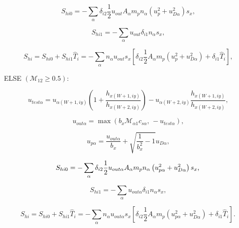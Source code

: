\documentclass[11pt]{article}
\begin{document}
\begin{equation}
S_{hi0}=-\sum_{\alpha}\delta_{i2}\frac{1}{2}u_{out}A_{\alpha}m_{p}n_{\alpha
}\left( u_{p}^{2}+u_{D\alpha}^{2}\right) s_{x}\text{,}   \label{c248}
\end{equation}

\begin{equation}
S_{hi1}=-\sum_{\alpha}u_{out}\delta_{i1}n_{\alpha}s_{x}\text{,} 
\label{c249}
\end{equation}

\begin{equation}
S_{hi}=S_{hi0}+S_{hi1}\widehat{T}_{i}=-\sum_{\alpha}n_{\alpha}u_{out}s_{x}%
\left[ \delta_{i2}\frac{1}{2}A_{\alpha}m_{p}\left(
u_{p}^{2}+u_{D\alpha}^{2}\right) +\delta_{i1}\widehat{T}_{i}\right] \text{,} 
\label{c250}
\end{equation}

\bigskip

ELSE $\left( \mathcal{M}_{12}\geq0.5\right) $:

\begin{equation}
u_{test\alpha}=u_{\alpha\left( W+1,iy\right) }\left( 1+\frac{h_{x\left(
W+1,iy\right) }}{h_{x\left( W+2,iy\right) }}\right) -u_{\alpha\left(
W+2,iy\right) }\frac{h_{x\left( W+1,iy\right) }}{h_{x\left( W+2,iy\right) }}%
\text{,}   \label{c251}
\end{equation}

\begin{equation}
u_{out\alpha}=\max\left( b_{x}\mathcal{M}_{\alpha1}c_{s\alpha}\text{, }%
-u_{test\alpha}\right) \text{,}   \label{cc251}
\end{equation}

\begin{equation}
u_{p\alpha}=\frac{u_{out\alpha}}{b_{x}}+\sqrt{\frac{1}{b_{x}^{2}}-1}%
u_{D\alpha}\text{,}   \label{c252}
\end{equation}

\begin{equation}
S_{hi0}=-\sum_{\alpha}\delta_{i2}\frac{1}{2}u_{out\alpha}A_{\alpha}m_{p}n_{%
\alpha}\left( u_{p\alpha}^{2}+u_{D\alpha}^{2}\right) s_{x}\text{,} 
\label{c253}
\end{equation}

\begin{equation}
S_{hi1}=-\sum_{\alpha}u_{out\alpha}\delta_{i1}n_{\alpha}s_{x}\text{,} 
\label{c254}
\end{equation}

\begin{equation}
S_{hi}=S_{hi0}+S_{hi1}\widehat{T}_{i}=-\sum_{\alpha}n_{\alpha}u_{out\alpha
}s_{x}\left[ \delta_{i2}\frac{1}{2}A_{\alpha}m_{p}\left(
u_{p\alpha}^{2}+u_{D\alpha}^{2}\right) +\delta_{i1}\widehat{T}_{i}\right] 
\text{.}   \label{c255}
\end{equation}
\end{document}
